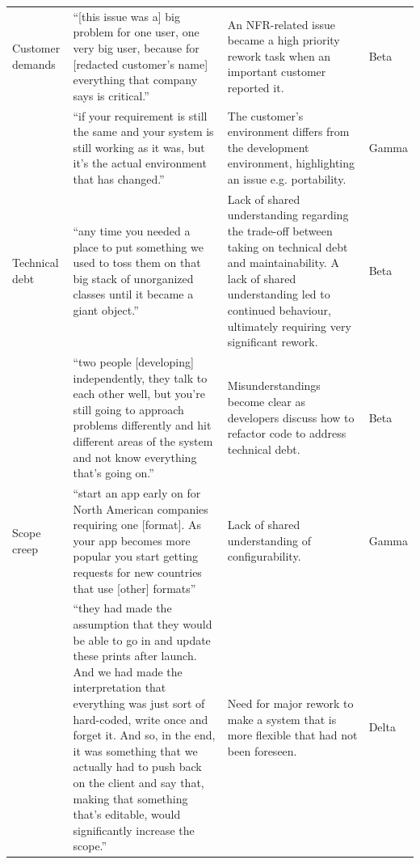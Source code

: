 \documentclass[smallextended]{svjour3}        %
\begin{document}
\begin{longtable}{P{1.5cm}p{4.8cm}p{3.3cm}p{1.3cm}}
Customer demands  
& ``[this issue was a] big problem for one user, one very big user, because for [redacted customer's name] everything that company says is critical.'' 
& An NFR-related issue became a high priority rework task when an important customer reported it.
& Beta\\

\addlinespace

& ``if your requirement is still the same and your system is still working as it was, but it's the actual environment that has changed.''
& The customer's environment differs from the development environment, highlighting an issue e.g. portability. 
& Gamma\\

\addlinespace

Technical debt  &
``any time you needed a place to put something we used to toss them on that big stack of
unorganized classes until it became a giant object.''
& Lack of shared understanding regarding the trade-off between taking on technical debt and maintainability. A lack of shared understanding led to continued behaviour, ultimately requiring very significant rework. 
& Beta\\

\addlinespace

& ``two people [developing] independently, they talk to each other well, but you’re still going to approach problems differently and hit different areas of the system and not know everything that’s going on.''
& Misunderstandings become clear as developers discuss how to refactor code to address technical debt.
& Beta \\

\addlinespace

Scope creep 
&
``start an app early on for North American companies requiring one [format]. As your app becomes more popular you start getting requests for new countries that use [other] formats'' 
& Lack of shared understanding of configurability.
&  Gamma\\

\addlinespace

& ``they had made the assumption that they would be able to go in and update these prints after launch. And we had made the interpretation that everything was just sort of hard-coded, write once and forget it. And so, in the end, it was something that we actually had to push back on the client and say that, making that something that’s editable, would significantly increase the scope.''
& Need for major rework to make a system that is more flexible that had not been foreseen.
& Delta\\


\end{longtable}
\end{document}
